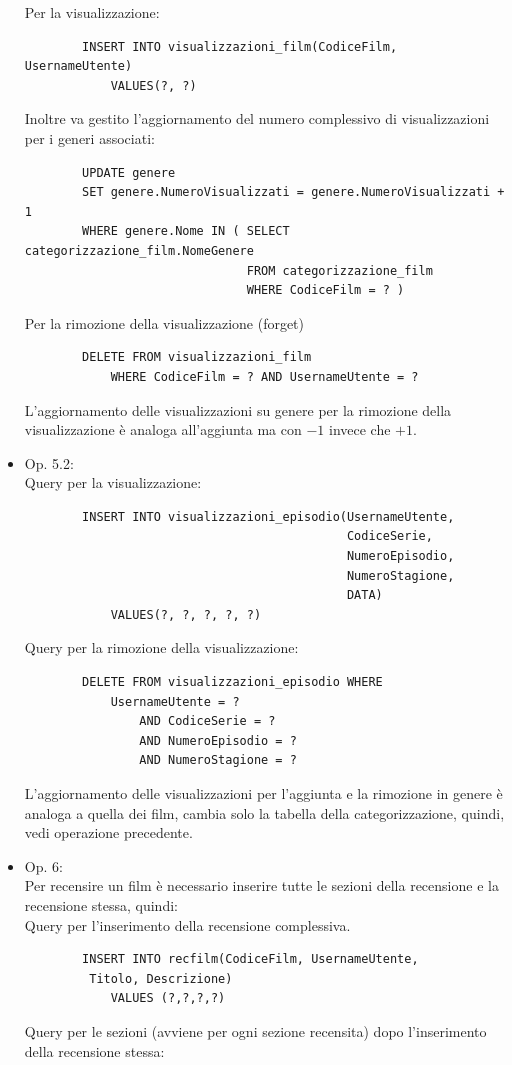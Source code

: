 \documentclass[a4paper,12pt]{report}
\begin{document}
\begin{itemize}
	Per la visualizzazione:
	\begin{verbatim}
		INSERT INTO visualizzazioni_film(CodiceFilm, UsernameUtente)
			VALUES(?, ?)
	\end{verbatim}
	Inoltre va gestito l'aggiornamento del numero complessivo di visualizzazioni per i generi associati:
	\begin{verbatim}
		UPDATE genere
		SET genere.NumeroVisualizzati = genere.NumeroVisualizzati + 1
		WHERE genere.Nome IN ( SELECT categorizzazione_film.NomeGenere
							   FROM categorizzazione_film
							   WHERE CodiceFilm = ? )
	\end{verbatim}
	Per la rimozione della visualizzazione (forget)
	\begin{verbatim}
		DELETE FROM visualizzazioni_film 
			WHERE CodiceFilm = ? AND UsernameUtente = ?
	\end{verbatim}
	L'aggiornamento delle visualizzazioni su genere per la rimozione della visualizzazione è analoga all'aggiunta ma con $-1$ invece che $+1$.
	\item Op. 5.2:\\
	Query per la visualizzazione:
	\begin{verbatim}
		INSERT INTO visualizzazioni_episodio(UsernameUtente,
											 CodiceSerie,
											 NumeroEpisodio,
											 NumeroStagione,
											 DATA)
			VALUES(?, ?, ?, ?, ?)
	\end{verbatim}
	Query per la rimozione della visualizzazione:
	\begin{verbatim}
		DELETE FROM visualizzazioni_episodio WHERE
			UsernameUtente = ? 
				AND CodiceSerie = ? 
				AND NumeroEpisodio = ? 
				AND NumeroStagione = ?
	\end{verbatim}
	L'aggiornamento delle visualizzazioni per l'aggiunta e la rimozione in genere è analoga a quella dei film, cambia solo la tabella della categorizzazione, quindi, vedi operazione precedente.
	\item Op. 6:\\
	Per recensire un film è necessario inserire tutte le sezioni della recensione e la recensione stessa, quindi:\\
	Query per l'inserimento della recensione complessiva.
	\begin{verbatim}
		INSERT INTO recfilm(CodiceFilm, UsernameUtente,
		 Titolo, Descrizione)
			VALUES (?,?,?,?)
	\end{verbatim}
	Query per le sezioni (avviene per ogni sezione recensita) dopo l'inserimento della recensione stessa:
	\begin{verbatim}

\end{verbatim}
\end{itemize}
\end{document}
